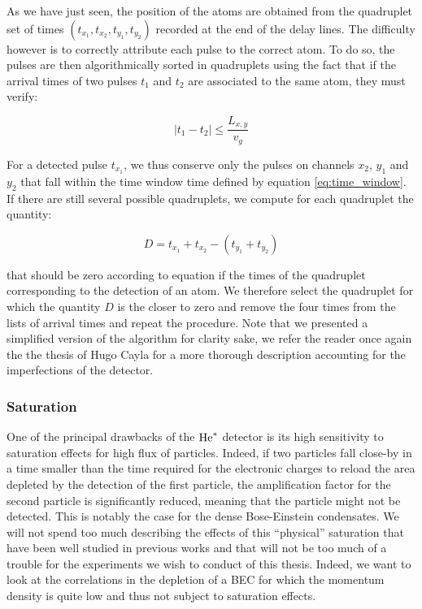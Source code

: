 As we have just seen, the position of the atoms are obtained from the quadruplet set of times $(t_{x_1},t_{x_2},t_{y_1},t_{y_2})$ recorded at the end of the delay lines. The difficulty however is to correctly attribute each pulse to the correct atom. To do so, the pulses are then algorithmically sorted in quadruplets using the fact that if the arrival times of two pulses $t_1$ and $t_2$ are associated to the same atom, they must verify:

\begin{equation}
    |t_1-t_2| \leq \frac{L_{x,y}}{v_g}
    \label{eq:time_window}
\end{equation}

\noindent For a detected pulse $t_{x_1}$, we thus conserve only the pulses on channels $x_2$, $y_1$ and $y_2$ that fall within the time window time defined by equation \ref{eq:time_window}. If there are still several possible quadruplets, we compute for each quadruplet the quantity:

\begin{equation}
    D = t_{x_1}+t_{x_2} - (t_{y_1}+t_{y_2})
\end{equation}

\noindent that should be zero according to equation \label{eq:tdet_MCP} if the times of the quadruplet corresponding to the detection of an atom. We therefore select the quadruplet for which the quantity $D$ is the closer to zero and remove the four times from the lists of arrival times and repeat the procedure. Note that we presented a simplified version of the algorithm for clarity sake, we refer the reader once again the the thesis of Hugo Cayla \cite{cayla_these} for a more thorough description accounting for the imperfections of the detector.

\subsubsection{Saturation}

\label{sec:saturation_effect}

One of the principal drawbacks of the $\mathrm{He}^*$ detector is its high sensitivity to saturation effects for high flux of particles. Indeed, if two particles fall close-by in a time smaller than the time required for the electronic charges to reload the area depleted by the detection of the first particle, the amplification factor for the second particle is significantly reduced, meaning that the particle might not be detected. This is notably the case for the dense Bose-Einstein condensates. We will not spend too much describing the effects of this ``physical'' saturation that have been well studied in previous works \cite{carcy_these,cayla_these,edgar1992spatial,nogrette2015characterization} and that will not be too much of a trouble for the experiments we wish to conduct of this thesis. Indeed, we want to look at the correlations in the depletion of a BEC for which the momentum density is quite low and thus not subject to saturation effects.

